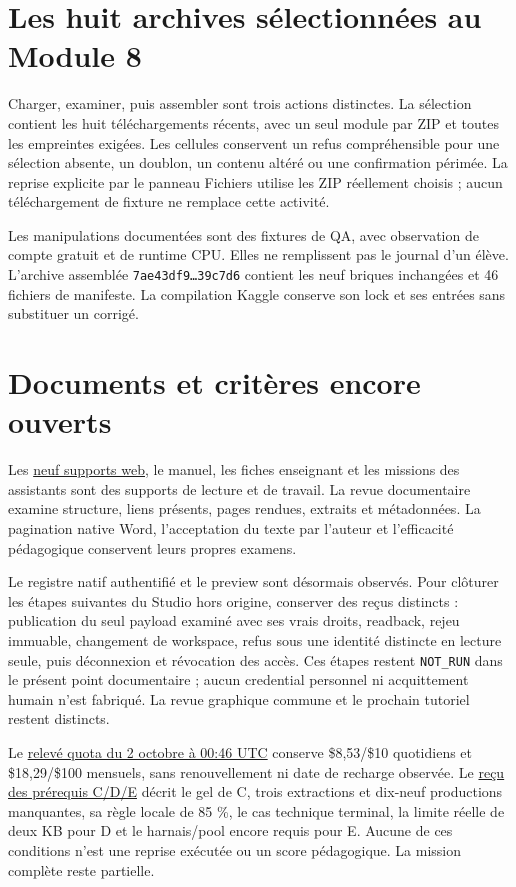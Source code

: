 \documentclass[
  canadien,
  11pt,
  a4paper,
]{report}
\begin{document}
\section{Les huit archives sélectionnées au Module
8}\label{les-huit-archives-suxe9lectionnuxe9es-au-module-8}

Charger, examiner, puis assembler sont trois actions distinctes. La
sélection contient les huit téléchargements récents, avec un seul module
par ZIP et toutes les empreintes exigées. Les cellules conservent un
refus compréhensible pour une sélection absente, un doublon, un contenu
altéré ou une confirmation périmée. La reprise explicite par le panneau
Fichiers utilise les ZIP réellement choisis ; aucun téléchargement de
fixture ne remplace cette activité.

Les manipulations documentées sont des fixtures de QA, avec observation
de compte gratuit et de runtime CPU. Elles ne remplissent pas le journal
d'un élève. L'archive assemblée \texttt{7ae43df9…39c7d6} contient les
neuf briques inchangées et 46 fichiers de manifeste. La compilation
Kaggle conserve son lock et ses entrées sans substituer un corrigé.

\section{Documents et critères encore
ouverts}\label{documents-et-crituxe8res-encore-ouverts}

Les \href{../CANVA_DELIVERY.md}{neuf supports web}, le manuel, les
fiches enseignant et les missions des assistants sont des supports de
lecture et de travail. La revue documentaire examine structure, liens
présents, pages rendues, extraits et métadonnées. La pagination native
Word, l'acceptation du texte par l'auteur et l'efficacité pédagogique
conservent leurs propres examens.

Le registre natif authentifié et le preview sont désormais observés.
Pour clôturer les étapes suivantes du Studio hors origine, conserver des
reçus distincts : publication du seul payload examiné avec ses vrais
droits, readback, rejeu immuable, changement de workspace, refus sous
une identité distincte en lecture seule, puis déconnexion et révocation
des accès. Ces étapes restent \texttt{NOT\_\allowbreak{}RUN} dans le présent point
documentaire ; aucun credential personnel ni acquittement humain n'est
fabriqué. La revue graphique commune et le prochain tutoriel restent
distincts.

Le
\href{../../../../receipts/formation/kaggle-quota-readback-20261002.json}{relevé
quota du 2 octobre à 00:46 UTC} conserve \$8,53/\$10 quotidiens et
\$18,29/\$100 mensuels, sans renouvellement ni date de recharge
observée. Le
\href{../../../../receipts/formation/campaign-resumption-prerequisites-20261002.json}{reçu
des prérequis C/D/E} décrit le gel de C, trois extractions et dix-neuf
productions manquantes, sa règle locale de 85 \%, le cas technique
terminal, la limite réelle de deux KB pour D et le harnais/pool encore
requis pour E. Aucune de ces conditions n'est une reprise exécutée ou un
score pédagogique. La mission complète reste partielle.
\end{document}
